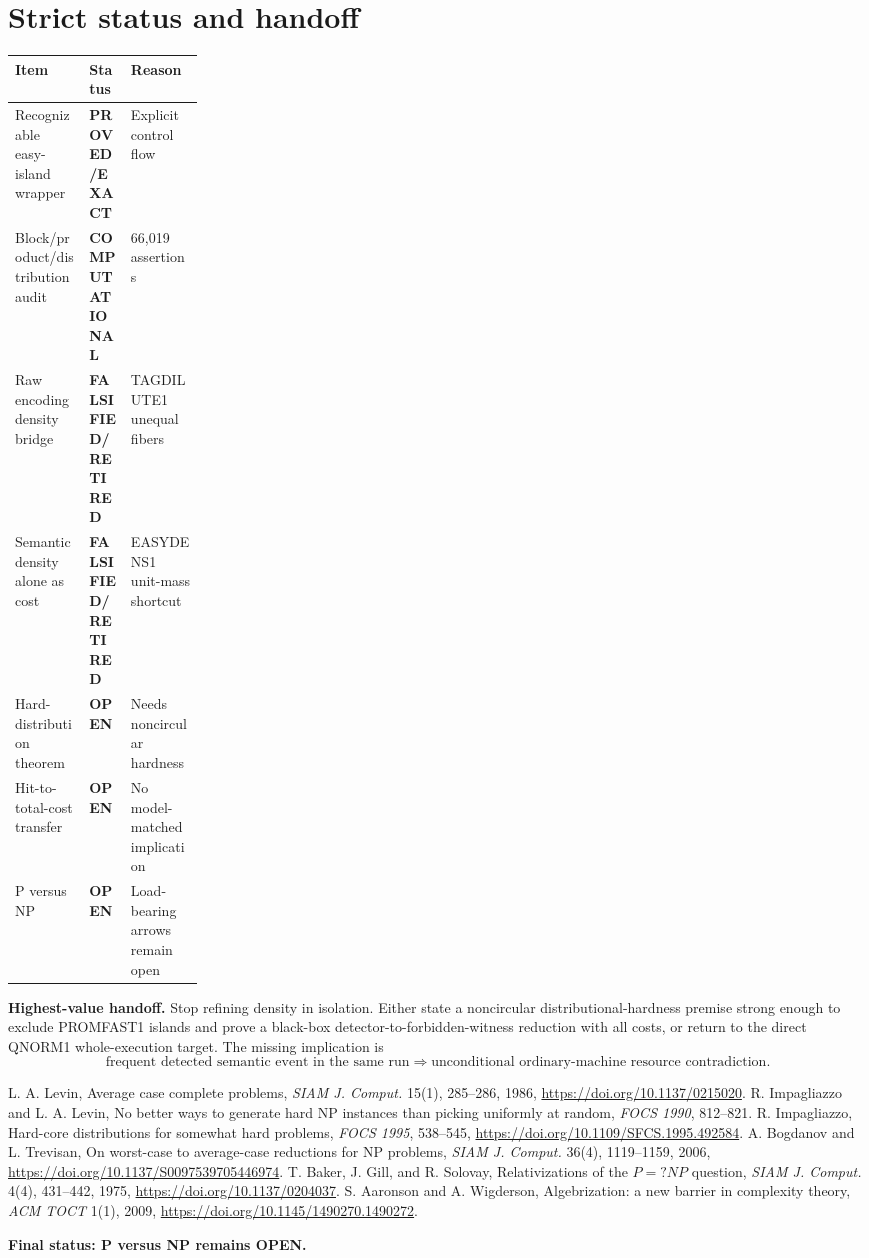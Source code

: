 \documentclass[11pt]{article}
\newcommand{\EXACT}{\textbf{PROVED/EXACT}}
\newcommand{\COMP}{\textbf{COMPUTATIONAL}}
\newcommand{\OPEN}{\textbf{OPEN}}
\newcommand{\RET}{\textbf{FALSIFIED/RETIRED}}
\begin{document}
\section{Strict status and handoff}
\begin{center}
\begin{tabularx}{0.98\linewidth}{Xp{0.22\linewidth}X}
\toprule Item & Status & Reason\\ \midrule
Recognizable easy-island wrapper & \EXACT & Explicit control flow\\
Block/product/distribution audit & \COMP & 66,019 assertions\\
Raw encoding density bridge & \RET & TAGDILUTE1 unequal fibers\\
Semantic density alone as cost & \RET & EASYDENS1 unit-mass shortcut\\
Hard-distribution theorem & \OPEN & Needs noncircular hardness\\
Hit-to-total-cost transfer & \OPEN & No model-matched implication\\
P versus NP & \OPEN & Load-bearing arrows remain open\\
\bottomrule
\end{tabularx}
\end{center}

\textbf{Highest-value handoff.} Stop refining density in isolation. Either
state a noncircular distributional-hardness premise strong enough to exclude
PROMFAST1 islands and prove a black-box detector-to-forbidden-witness
reduction with all costs, or return to the direct QNORM1 whole-execution
target. The missing implication is
\[
 \boxed{\text{frequent detected semantic event in the same run}
 \Longrightarrow
 \text{unconditional ordinary-machine resource contradiction}.}
\]

\begin{thebibliography}{99}
 L. A. Levin, Average case complete problems,
\emph{SIAM J. Comput.} 15(1), 285--286, 1986,
\url{https://doi.org/10.1137/0215020}.
 R. Impagliazzo and L. A. Levin, No better ways to generate hard
NP instances than picking uniformly at random, \emph{FOCS 1990}, 812--821.
 R. Impagliazzo, Hard-core distributions for somewhat hard
problems, \emph{FOCS 1995}, 538--545,
\url{https://doi.org/10.1109/SFCS.1995.492584}.
 A. Bogdanov and L. Trevisan, On worst-case to average-case
reductions for NP problems, \emph{SIAM J. Comput.} 36(4), 1119--1159, 2006,
\url{https://doi.org/10.1137/S0097539705446974}.
 T. Baker, J. Gill, and R. Solovay, Relativizations of the
\(P=?NP\) question, \emph{SIAM J. Comput.} 4(4), 431--442, 1975,
\url{https://doi.org/10.1137/0204037}.
 S. Aaronson and A. Wigderson, Algebrization: a new barrier in
complexity theory, \emph{ACM TOCT} 1(1), 2009,
\url{https://doi.org/10.1145/1490270.1490272}.
\end{thebibliography}

\bigskip
\noindent\textbf{Final status: P versus NP remains OPEN.}

\end{document}
